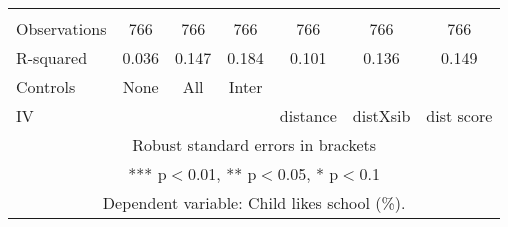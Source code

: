 \begin{tabular}{lcccccc}
 &  &  &  &  &  &  \\
Observations & 766 & 766 & 766 & 766 & 766 & 766 \\
R-squared & 0.036 & 0.147 & 0.184 & 0.101 & 0.136 & 0.149 \\
Controls & None & All & Inter &  &  &  \\
 IV &  &  &  & distance & distXsib & dist score \\ \hline
\multicolumn{7}{c}{ Robust standard errors in brackets} \\
\multicolumn{7}{c}{ *** p$<$0.01, ** p$<$0.05, * p$<$0.1} \\
\multicolumn{7}{c}{ Dependent variable: Child likes school (\%).} \\
\end{tabular}
